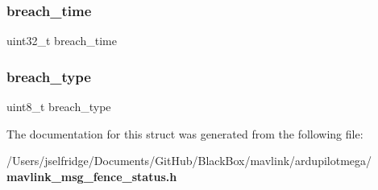 \mbox{\label{struct____mavlink__fence__status__t_a5f81c3a032bc1a8dea04adf6102d629f}} 
\subsubsection{breach\+\_\+time}
{\footnotesize\ttfamily uint32\+\_\+t breach\+\_\+time}

\mbox{\label{struct____mavlink__fence__status__t_ae7ff30f60f7798e11bd0ff3790dd8a25}} 
\subsubsection{breach\+\_\+type}
{\footnotesize\ttfamily uint8\+\_\+t breach\+\_\+type}



The documentation for this struct was generated from the following file\+:\begin{DoxyCompactItemize}
\item 
/\+Users/jselfridge/\+Documents/\+Git\+Hub/\+Black\+Box/mavlink/ardupilotmega/\textbf{ mavlink\+\_\+msg\+\_\+fence\+\_\+status.\+h}\end{DoxyCompactItemize}
